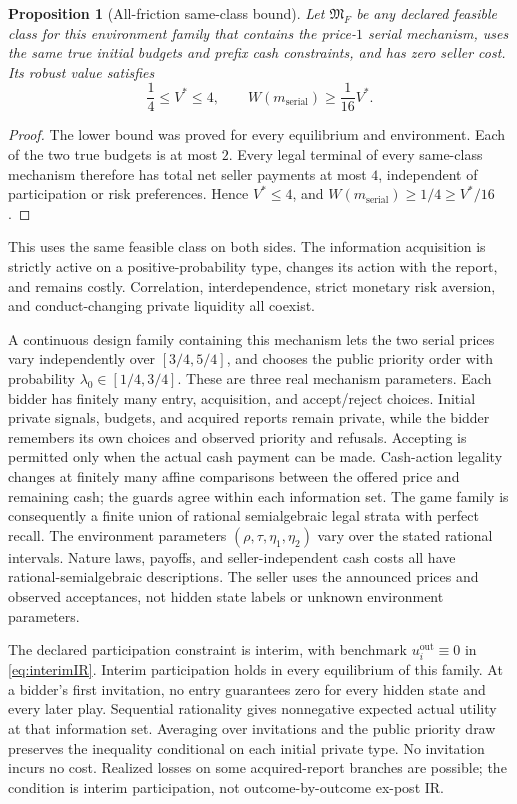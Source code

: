 \documentclass[11pt,a4paper]{article}
\numberwithin{equation}{section}
\newtheorem{proposition}[theorem]{Proposition}
\theoremstyle{definition}
\begin{document}
\begin{proposition}[All-friction same-class bound]\label{prop:ratio}
Let \(\mathfrak M_F\) be any declared feasible class for this environment
family that contains the price-\(1\) serial mechanism, uses the same
true initial budgets and prefix cash constraints, and has zero seller
cost. Its robust value satisfies
\[
 \frac14\le V^*\le4,
 \qquad W(m_{\mathrm{serial}})\ge\frac1{16}V^*.
\]
\end{proposition}
\begin{proof}
The lower bound was proved for every equilibrium and environment.
Each of the two true budgets is at most \(2\).
Every legal terminal of every same-class mechanism therefore has
total net seller payments at most \(4\), independent of participation
or risk preferences. Hence \(V^*\le4\), and
\(W(m_{\mathrm{serial}})\ge1/4\ge V^*/16\).
\end{proof}
This uses the same feasible class on both sides.
The information acquisition is strictly active on a positive-probability
type, changes its action with the report, and remains costly.
Correlation, interdependence, strict monetary risk aversion, and
conduct-changing private liquidity all coexist.

A continuous design family containing this mechanism lets the two
serial prices vary independently over \([3/4,5/4]\), and chooses the
public priority order with probability \(\lambda_0\in[1/4,3/4]\).
These are three real mechanism parameters.
Each bidder has finitely many entry, acquisition, and accept/reject
choices. Initial private signals, budgets, and acquired reports remain
private, while the bidder remembers its own choices and observed
priority and refusals.
Accepting is permitted only when the actual cash payment can be made.
Cash-action legality changes at finitely many affine comparisons
between the offered price and remaining cash; the guards agree within
each information set.
The game family is consequently a finite union of rational
semialgebraic legal strata with perfect recall.
The environment parameters
\((\rho,\tau,\eta_1,\eta_2)\) vary over the stated rational intervals.
Nature laws, payoffs, and seller-independent cash costs all have
rational-semialgebraic descriptions.
The seller uses the announced prices and observed acceptances, not
hidden state labels or unknown environment parameters.

The declared participation constraint is interim, with benchmark
\(u_i^{\mathrm{out}}\equiv0\) in \eqref{eq:interimIR}.
Interim participation holds in every equilibrium of this family.
At a bidder's first invitation, no entry guarantees zero for every
hidden state and every later play.
Sequential rationality gives nonnegative expected actual utility at
that information set.
Averaging over invitations and the public priority draw preserves
the inequality conditional on each initial private type.
No invitation incurs no cost.
Realized losses on some acquired-report branches are possible;
the condition is interim participation, not outcome-by-outcome ex-post IR.
\end{document}
